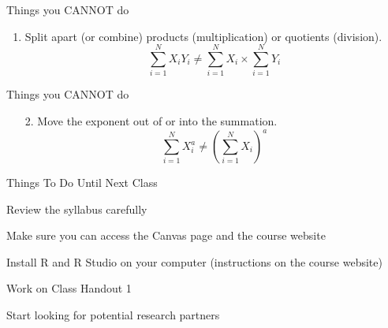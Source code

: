 \documentclass{./../div_teaching_slides}
\begin{document}
\begin{frame}{Things you CANNOT do}
\begin{enumerate}
\item Split apart (or combine) products (multiplication) or quotients (division).
$$ \sum_{i=1}^N X_i Y_i \neq  \sum_{i=1}^N X_i \times \sum_{i=1}^N Y_i   $$
\end{enumerate}
\end{frame}

\begin{frame}{Things you CANNOT do}
\begin{enumerate}
\item[2.] Move the exponent out of or into the summation.
$$ \sum_{i=1}^N X_i^a \neq  \left(\sum_{i=1}^N X_i\right)^a $$
\end{enumerate}
\end{frame}

\begin{frame}{Things To Do Until Next Class}
\begin{wenumerate}
\item Review the syllabus carefully
\item Make sure you can access the Canvas page and the course website
\item Install R and R Studio on your computer (instructions on the course website)
\item Work on Class Handout 1
\item Start looking for potential research partners 
\end{wenumerate}
\end{frame}
\end{document}
